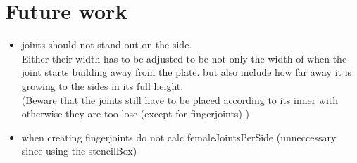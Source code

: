 \documentclass[../ClassicThesis.tex]{subfiles}
\begin{document}
    
    
\section{Future work}
    \begin{itemize}
        \item joints should not stand out on the side. \\
        Either their width has to be adjusted to be not only the width of when the joint starts building away from the plate. but also include how far away it is growing to the sides in its full height. \\
    (Beware that the joints still have to be placed according to its inner with otherwise they are too lose (except for fingerjoints) )
        \item when creating fingerjoints do not calc femaleJointsPerSide (unneccessary since using the stencilBox)
    \end{itemize}
\end{document}
